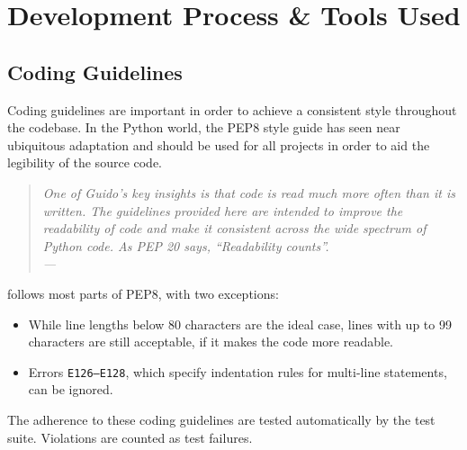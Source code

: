 
\chapter{Development Process \& Tools Used}

\label{ch:development}


\section{Coding Guidelines}


Coding guidelines are important in order to achieve a consistent style
throughout the codebase. In the Python world, the PEP8 style guide
\cite{pep8:2001} has seen near ubiquitous adaptation and should be used for all
projects in order to aid the legibility of the source code.

\begin{quote}{\slshape
One of Guido's key insights is that code is read much more often than it is
written. The guidelines provided here are intended to improve the readability of
code and make it consistent across the wide spectrum of Python code. As PEP 20
says, ``Readability counts''. \\ \medskip
---  \citep{pep8:2001}
}\end{quote}

\noindent \tangible{} follows most parts of PEP8, with two exceptions:

\begin{itemize}
	\item While line lengths below 80 characters are the ideal case, lines with up
		to 99 characters are still acceptable, if it makes the code more readable.
	\item Errors \texttt{E126--E128}, which specify indentation rules for
		multi-line statements, can be ignored.
\end{itemize}

\noindent The adherence to these coding guidelines are tested automatically by
the test suite. Violations are counted as test failures.

